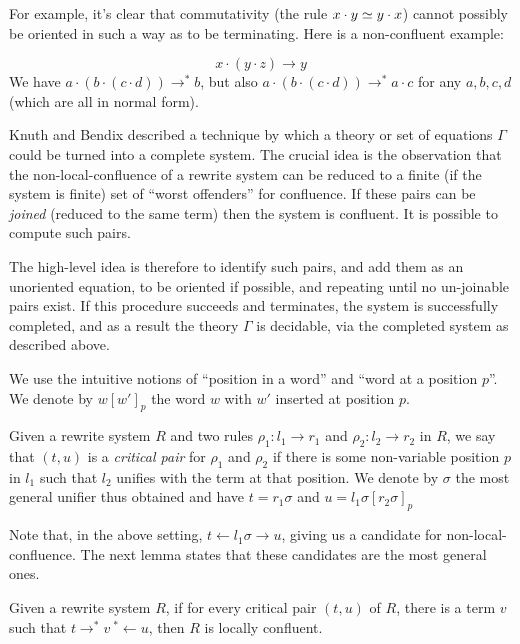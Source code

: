 For example, it's clear that commutativity (the rule $x\cdot y\simeq y\cdot x$) cannot possibly be oriented in such a way as to be terminating. Here is a non-confluent example:

\[ x \cdot (y \cdot z) \rightarrow y \]
We have $a\cdot (b \cdot (c \cdot d)) \rightarrow^* b$, but also $a\cdot (b\cdot (c\cdot d))\rightarrow^* a\cdot c$ for any $a, b, c, d$ (which are all in normal form).

Knuth and Bendix \cite{knuth-bendix} described a technique by which a theory or set of equations $\Gamma$ could be turned into a complete system. The crucial idea is the observation that the non-local-confluence of a rewrite system can be reduced to a finite (if the system is finite) set of ``worst offenders'' for confluence. If these pairs can be \emph{joined} (reduced to the same term) then the system is confluent. It is possible to compute such pairs.

The high-level idea is therefore to identify such pairs, and add them as an unoriented equation, to be oriented if possible, and repeating until no un-joinable pairs exist. If this procedure succeeds and terminates, the system is successfully completed, and as a result the theory $\Gamma$ is decidable, via the completed system as described above.

We use the intuitive notions of ``position in a word'' and ``word at a position $p$''. We denote by $w[w']_p$ the word $w$ with $w'$ inserted at position $p$.

\begin{definition}
  Given a rewrite system $R$ and two rules $\rho_1: l_1\rightarrow r_1$ and $\rho_2: l_2\rightarrow r_2$ in $R$, we say that $(t, u)$ is a \emph{critical pair} for $\rho_1$ and $\rho_2$ if there is some non-variable position $p$ in $l_1$ such that $l_2$ unifies with the term at that position. We denote by $\sigma$ the most general unifier thus obtained and have $t = r_1\sigma$ and $u = l_1\sigma[r_2\sigma]_p$
\end{definition}

Note that, in the above setting, $t\leftarrow l_1\sigma\rightarrow u$, giving us a candidate for non-local-confluence. The next lemma states that these candidates are the most general ones.

\begin{theorem}
  Given a rewrite system $R$, if for every critical pair $(t, u)$ of $R$, there is a term $v$ such that $t\rightarrow^* v\ {}^*\leftarrow u$, then $R$ is locally confluent.
\end{theorem}

